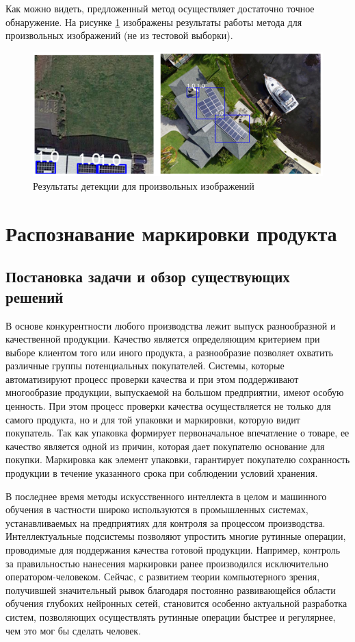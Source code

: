 Как можно видеть, предложенный метод осуществляет достаточно точное обнаружение. На рисунке \ref{fig:random_results} изображены результаты работы метода для произвольных изображений (не из тестовой выборки).

\begin{figure}[!ht]
	\centering
	\includegraphics[width=16cm]{man-source/images/ch4/pic4-23.png}
	\caption{Результаты детекции для произвольных изображений}
	\label{fig:random_results}
\end{figure}

\section{Распознавание маркировки продукта}

\subsection{Постановка задачи и обзор существующих решений}

В основе конкурентности любого производства лежит выпуск разнообразной и качественной продукции. Качество является определяющим критерием при выборе клиентом того или иного продукта, а разнообразие позволяет охватить различные группы потенциальных покупателей. Системы, которые автоматизируют процесс проверки качества и при этом поддерживают многообразие продукции, выпускаемой на большом предприятии, имеют особую ценность. При этом процесс проверки качества осуществляется не только для самого продукта, но и для той упаковки и маркировки, которую видит покупатель. Так как упаковка формирует первоначальное впечатление о товаре, ее качество является одной из причин, которая дает покупателю основание для покупки. Маркировка как элемент упаковки, гарантирует покупателю сохранность продукции в течение указанного срока при соблюдении условий хранения.

В последнее время методы искусственного интеллекта в целом и машинного обучения в частности широко используются в промышленных системах, устанавливаемых на предприятиях для контроля за процессом производства. Интеллектуальные подсистемы позволяют упростить многие рутинные операции, проводимые для поддержания качества готовой продукции. Например, контроль за правильностью нанесения маркировки ранее производился исключительно оператором-человеком. Сейчас, с развитием теории компьютерного зрения, получившей значительный рывок благодаря постоянно развивающейся области обучения глубоких нейронных сетей, становится особенно актуальной разработка систем, позволяющих осуществлять рутинные операции быстрее и регулярнее, чем это мог бы сделать человек.

